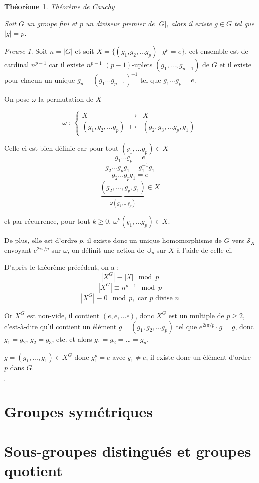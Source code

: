 \documentclass[]{article}
\newtheorem{mythm}{Théorème}
\theoremstyle{remark}
\newtheorem{myproof}{Preuve}
\theoremstyle{definition}
\newcommand{\cqfd}{
	\hfill$\square$
}
\newcommand{\func}[5]{
#1 ~ : ~ \left\{ \begin{array}{lcl}
	#2 & \longrightarrow & #3 \\
	#4 & \longmapsto & #5
\end{array}
\right.
}
\begin{document}
\begin{mythm}Théorème de Cauchy

	Soit $G$ un groupe fini et $p$ un diviseur premier de $|G|$, alors il existe $g \in G$ tel que $|g|=p$.
\end{mythm}

\begin{myproof}
	Soit $n = |G|$ et soit $X = \{(g_1, g_2, ...g_p) ~ | ~ g^p = e\}$, cet ensemble est de cardinal $n^{p-1}$ car il existe $n^{p-1}$ $(p-1)$-uplets $(g_1, ..., g_{p-1})$ de $G$ et il existe pour chacun un unique $g_p = (g_1...g_{p-1})^{-1}$ tel que $g_1...g_p = e$.
	
	On pose $\omega$ la permutation de $X$
	
	$$\func{\omega}{X}{X}{(g_1, g_2, ... g_p)}{(g_2, g_3, ... g_p, g_1)}$$
	
	Celle-ci est bien définie car pour tout $(g_1, ... g_p) \in X$
	$$g_1...g_p = e$$
	$$g_2...g_p g_1 = g_1^{-1} g_1$$
	$$g_2...g_p g_1 = e$$
	$$\underbrace{(g_2, ..., g_p, g_1)}_{\omega(g_1, ...g_p)} \in X$$
	
	et par récurrence, pour tout $k \geqslant 0$, $\omega^k (g_1, ...g_p) \in X$.
	
	De plus, elle est d'ordre $p$, il  existe donc un unique homomorphisme de $G$ vers $\mathcal{S}_X$ envoyant $e^{2 i \pi / p}$ sur $\omega$, on définit une action de $\mathbb{U}_p$ sur $X$ à l'aide de celle-ci.
	
	D'après le théorème précédent, on a :
	$$\left|X^G\right| \equiv |X| \mod p$$
	$$\left|X^G\right| \equiv n^{p-1} \mod p$$
	$$\left|X^G\right| \equiv 0 \mod p, \text{ car $p$ divise $n$}$$
	
	Or $X^G$ est non-vide, il contient $(e, e, ...e)$, donc $X^G$ est un multiple de $p \geqslant 2$, c'est-à-dire qu'il contient un élément $g=(g_1, g_2, ... g_p)$ tel que $e^{2 i \pi / p} \cdot g = g$, donc $g_1 = g_2$, $g_2 = g_3$, etc. et alors $g_1 = g_2 = ... = g_p$.
	
	$g=(g_1, ..., g_1) \in X^G$ donc $g_1^p = e$ avec $g_1 \neq e$, il existe donc un élément d'ordre $p$ dans $G$.
	
	\cqfd
\end{myproof}


\part{Groupes symétriques}
\part{Sous-groupes distingués et groupes quotient}
\end{document}
